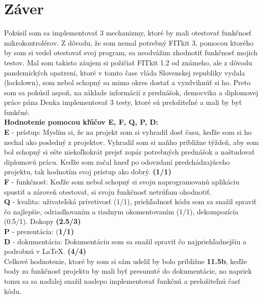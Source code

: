 \documentclass[11pt,a4paper]{article}
\begin{document}
    
\newpage

\section{Záver}

    \indent Pokúsil som sa implementovať 3 mechanizmy, ktoré by mali otestovať funkčnosť mikrokontrolérov. Z dôvodu, že som nemal potrebný FITkit 3, pomocou ktorého by som si vedel otestovať svoj program, sa neodvážim zhodnotiť funkčnosť mojich testov. Mal som takisto záujem si požičiať FITkit 1.2 od známeho, ale z dôvodu pandemických opatrení, ktoré v tomto čase vláda Slovenskej republiky vydala (lockdown), som nebol schopný sa mimo okres dostať a vyzdvihnúť si ho. Preto som sa pokúsil aspoň, na základe informácií z prednášok, democvika a diplomovej práce pána Denka implementovať 3 testy, ktoré sú preložiteľné a mali by byť funkčné.  \\[1em]
    \textbf{Hodnotenie pomocou kľúčov E, F, Q, P, D:}\\
    \textbf{E} - prístup: Myslím si, že na projekt som si vyhradil dosť času, keďže som si ho nechal ako posledný z projektov. Vyhradil som si naňho približne týždeň, aby som bol schopný si ešte niekoľkokrát prejsť zopár potrebných prednášok a naštudovať diplomovú prácu. Keďže som začal hneď po odovzdaní predchádzajúceho projektu, tak hodnotím svoj prístup ako dobrý. \textbf{(1/1)}\\
    \textbf{F} - funkčnosť: Keďže som nebol schopný si svoju naprogramovanú aplikáciu spustiť a zároveň otestovať, si svoju funkčnosť netrúfam ohodnotiť.\\
    \textbf{Q} - kvalita: uživateľská prívetivosť (1/1), priehľadnosť kódu som sa snažil spraviť čo najlepšie, odriadkovaním a riadnym okomentovaním (1/1), dekompozícia (0.5/1). Dokopy \textbf{(2.5/3)}\\
    \textbf{P} - prezentácia: (\textbf{1/1)}\\
    \textbf{D} - dokumentácia: Dokumentáciu som sa snažil spraviť čo najpriehľadnejšiu a podrobnú v \LaTeX. \textbf{(4/4)}\\[1em]
    Celkové hodnotenie, ktoré by som si sám udelil by bolo približne \textbf{11.5b}, keďže body za funkčnosť projektu by mali byť presunuté do dokumentácie, no napriek tomu sa sa naďalej snažil naslepo implementovať funkčnú a preložiteľnú časť kódu.
    
\newpage %
\printbibliography
\end{document}

